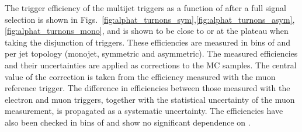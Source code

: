 


The trigger efficiency of the multijet triggers as a function of \mht after a full signal selection 
is shown in Figs.~\ref{fig:alphat_turnons_sym},\ref{fig:alphat_turnons_asym},\ref{fig:alphat_turnons_mono}, and is shown to be close to or at the plateau when taking 
the disjunction of triggers. These efficiencies are measured in bins of \scalht and \mht
per jet topology (monojet, symmetric and asymmetric). The measured
efficiencies and their uncertainties are applied as corrections to the MC
samples. The central value of the correction is taken from the efficiency
measured with the muon reference trigger. The difference in efficiencies between
those measured with the electron and muon triggers, together with the
statistical uncertainty of the muon measurement, is propagated as a systematic
uncertainty. The efficiencies have also been checked in bins of \njet and show
no significant dependence on \njet.

